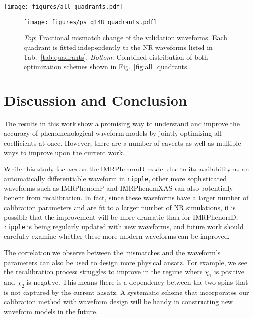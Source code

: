 \documentclass[twocolumn]{aastex631}
\newcommand{\ripple}{\texttt{ripple}}
\begin{document}
\begin{figure*}[t]
	\centering
	\texttt{[image: figures/all\_quadrants.pdf]}
	\caption{Distributions of mismatches for both optimization schemes in all 4 regions of Fig.~\ref{fig:ps_q148_quadrant}. 
	We use a constant PSD to calculate the mismatch and
	$\mathcal{L}_{\mathrm{ave}}$ as the loss function. The medians of each distributions are indicated by dashed
	lines.}
	\label{fig:all_quadrants}
\end{figure*}

\begin{figure}[t]
	\centering
	\texttt{[image: figures/ps\_q148\_quadrants.pdf]}
	\caption{\textit{Top}: Fractional mismatch change of the validation waveforms.
	Each quadrant is fitted independently to the NR waveforms listed in Tab.~\ref{tab:quadrants}.
	\textit{Bottom}: Combined distribution of both optimization schemes shown in Fig.~\ref{fig:all_quadrants}.}
	\label{fig:ps_q148_quadrant}
\end{figure}

\section{Discussion and Conclusion} \label{sec:discussion}

The results in this work show a promising way to understand and improve the
accuracy of phenomenological waveform models by jointly optimizing all
coefficients at once. However, there are a number of caveats as well
as multiple ways to improve upon the current work.

While this study focuses on the IMRPhenomD model due to its availability as an
automatically differentiable waveform in \ripple, other more sophisticated waveforms such as
IMRPhenomP \citep{hannam2014simple, khan2019phenomenological} and IMRPhenomXAS
\citep{pratten2020setting,pratten2021computationally} can also potentially benefit
from recalibration. In fact, since these waveforms have a larger number of calibration
parameters and are fit to a larger number of NR simulations, it is possible that the 
improvement will be more dramatic than for IMRPhenomD. {\ripple} is being regularly
updated with new waveforms, and future work should carefully examine whether these more
modern waveforms can be improved. %

The correlation we observe between the mismatches and the waveform's parameters
can also be used to design more physical ansatz. For example, we see the
recalibration process struggles to improve in the regime where $\chi_{1}$ is
positive and $\chi_{2}$ is negative. This means there is a dependency between
the two spins that is not captured by the current ansatz. A systematic scheme that
incorporates our calibration method with waveform design will be handy in
constructing new waveform models in the future. 
\end{document}
